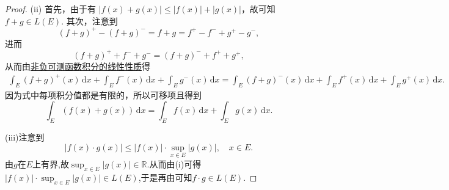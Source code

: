 \documentclass[../../main.tex]{subfiles}%
\begin{document}
\begin{proof}
(ii) 首先，由于有 \( |f(x) + g(x)| \leqslant  |f(x)| + |g(x)| \)，故可知 \( f + g \in L(E) \). 其次，注意到
\[
(f + g)^+ - (f + g)^- = f + g = f^+ - f^- + g^+ - g^-,
\]
进而
\[
(f + g)^+ + f^- + g^- = (f + g)^- + f^+ + g^+,
\]
从而由\hyperref[theorem:非负可测函数积分的线性性质]{非负可测函数积分的线性性质}得
\begin{align*}
\int_E (f + g)^+(x) \, \mathrm{d}x + \int_E f^-(x) \, \mathrm{d}x + \int_E g^-(x) \, \mathrm{d}x 
= \int_E (f + g)^-(x) \, \mathrm{d}x + \int_E f^+(x) \, \mathrm{d}x + \int_E g^+(x) \, \mathrm{d}x.
\end{align*}
因为式中每项积分值都是有限的，所以可移项且得到
\[
\int_E (f(x) + g(x)) \, \mathrm{d}x = \int_E f(x) \, \mathrm{d}x + \int_E g(x) \, \mathrm{d}x.
\]

(iii)注意到
\[
|f(x) \cdot g(x)| \leqslant  |f(x)| \cdot \sup_{x \in E} |g(x)|, \quad x \in E.
\]
由$g$在$E$上有界,故$\sup_{x \in E} |g(x)|\in \mathbb{R}$.从而由(i)可得$|f(x)| \cdot \sup_{x \in E} |g(x)|\in L(E)$,于是再由可知$f\cdot g\in L(E)$.

\end{proof}
\end{document}
